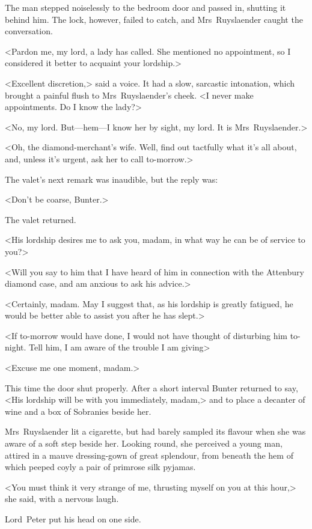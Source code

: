 The man stepped noiselessly to the bedroom door and passed in, shutting it behind him. The lock, however, failed to catch, and Mrs~Ruyslaender caught the conversation.

<Pardon me, my lord, a lady has called. She mentioned no appointment, so I considered it better to acquaint your lordship.>

<Excellent discretion,> said a voice. It had a slow, sarcastic intonation, which brought a painful flush to Mrs~Ruyslaender's cheek. <I never make appointments. Do I know the lady?>

<No, my lord. But—hem—I know her by sight, my lord. It is Mrs~Ruyslaender.>

<Oh, the diamond-merchant's wife. Well, find out tactfully what it's all about, and, unless it's urgent, ask her to call to-morrow.>

The valet's next remark was inaudible, but the reply was:

<Don't be coarse, Bunter.>

The valet returned.

<His lordship desires me to ask you, madam, in what way he can be of service to you?>

<Will you say to him that I have heard of him in connection with the Attenbury diamond case, and am anxious to ask his advice.>

<Certainly, madam. May I suggest that, as his lordship is greatly fatigued, he would be better able to assist you after he has slept.>

<If to-morrow would have done, I would not have thought of disturbing him to-night. Tell him, I am aware of the trouble I am giving\longdash>

<Excuse me one moment, madam.>

This time the door shut properly. After a short interval Bunter returned to say, <His lordship will be with you immediately, madam,> and to place a decanter of wine and a box of Sobranies beside her.

Mrs~Ruyslaender lit a cigarette, but had barely sampled its flavour when she was aware of a soft step beside her. Looking round, she perceived a young man, attired in a mauve dressing-gown of great splendour, from beneath the hem of which peeped coyly a pair of primrose silk pyjamas.

<You must think it very strange of me, thrusting myself on you at this hour,> she said, with a nervous laugh.

Lord~Peter put his head on one side.

